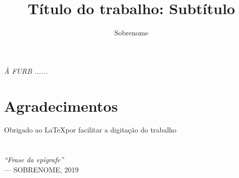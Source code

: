 \documentclass[diss]{mdtfurb}
\title{Título do trabalho: Subtítulo}
\author{Sobrenome}{Nome Autor}
\institute{Centro de...} %
\begin{document}
\maketitle





\chapter*{}

\begin{flushright}
\mbox{}\vfill
{\sffamily\itshape À FURB ......}
\end{flushright}


\chapter*{Agradecimentos} 
Obrigado ao \LaTeX por facilitar a digitação do trabalho


\chapter*{}

\begin{flushright}
\mbox{}\vfill
{\sffamily\itshape
``Frase da epígrafe'' \\ }
--- \textsc{SOBRENOME, 2019}
\end{flushright}
\end{document}
